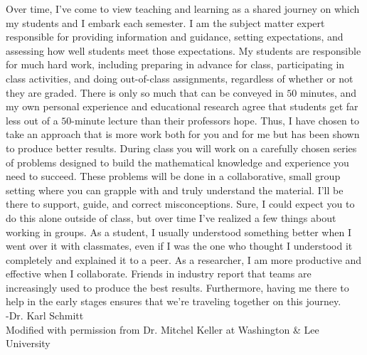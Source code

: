 \documentclass[letterpaper,oneside]{book}%
\theoremstyle{plain}
\theoremstyle{box}
\theoremstyle{problem}
\begin{document}
\noindent Over time, I've come to view teaching and learning as a shared journey on which my students and I
embark each semester. I am the subject matter expert responsible for
providing information and guidance, setting expectations, and
assessing how well students meet those expectations. My students are
responsible for much hard work, including preparing in advance for
class, participating in class activities, and doing out-of-class
assignments, regardless of whether or not they are graded. There is
only so much that can be conveyed in $50$ minutes, and my own personal
experience and educational research agree that students get far less
out of a $50$-minute lecture than their professors hope. Thus, I have
chosen to take an approach that is more work both for you and for me
but has been shown to produce better results. During class you
will work on a carefully chosen series of problems designed to build
the mathematical knowledge and experience you need to succeed. These
problems will be done in a collaborative, small group setting where 
you can grapple with and truly understand the material. I'll be there to support, guide, and correct
misconceptions. Sure, I could expect you to do this alone outside of
class, but over time I've realized a few things about working in
groups. As a student, I usually understood something better when I
went over it with classmates, even if I was the one who thought I
understood it completely and explained it to a peer. As a researcher,
I am more productive and effective when I collaborate. Friends in
industry report that teams are increasingly used to produce the best
results. Furthermore, having me there to help in the early stages
ensures that we're traveling together on this journey.\\

-Dr. Karl Schmitt\\
Modified with permission from Dr. Mitchel Keller at Washington \& Lee University

\fi

\end{document}
